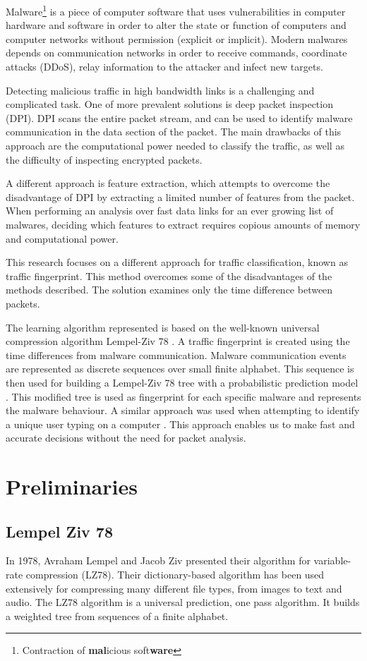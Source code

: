 \documentclass[13pt,journal,compsoc,onecolumn]{IEEEtran}
\begin{document}
Malware\footnote{Contraction of \textbf{mal}icious soft\textbf{ware}} is a piece of computer software that uses vulnerabilities in computer hardware and software in order to alter the state or function of computers and computer networks without permission (explicit or implicit). Modern malwares depends on communication networks in order to receive commands, coordinate attacks (DDoS), relay information to the attacker and infect new targets.

Detecting malicious traffic in high bandwidth links is a challenging and complicated task. One of more prevalent solutions is deep packet inspection (DPI). DPI scans the entire packet stream, and can be used to identify malware communication in the data section of the packet. The main drawbacks of this approach are the computational power needed to classify the traffic, as well as the difficulty of inspecting encrypted packets. 

A different approach is feature extraction, which attempts to overcome the disadvantage of DPI by extracting a limited number of features from the packet. When performing an analysis over fast data links for an ever growing list of malwares, deciding which features to extract requires copious amounts of memory and computational power.

This research focuses on a different approach for traffic classification, known as traffic fingerprint. This method overcomes some of the disadvantages of the methods described. The solution examines only the time difference between packets.

The learning algorithm represented is based on the well-known universal compression algorithm Lempel-Ziv 78 \cite{Lem78}. A traffic fingerprint is created using the time differences from malware communication. Malware communication events are represented as discrete sequences over small finite alphabet. This sequence is then used for building a Lempel-Ziv 78 tree with a probabilistic prediction model \cite{MFe92}. This modified tree is used as fingerprint for each specific malware and represents the malware behaviour. A similar approach was used when attempting to identify a unique user typing on a computer \cite{Nis03}.
This approach enables us to make fast and accurate decisions without the need for packet analysis.

\section{Preliminaries}
\subsection{Lempel Ziv 78}
In 1978, Avraham Lempel and Jacob Ziv presented their algorithm for variable-rate compression \cite{Lem78} (LZ78). Their dictionary-based algorithm has been used extensively for compressing many different file types, from images to text and audio.
The LZ78 algorithm is a universal prediction, one pass algorithm. It builds a weighted tree from sequences of a finite alphabet.
\end{document}

